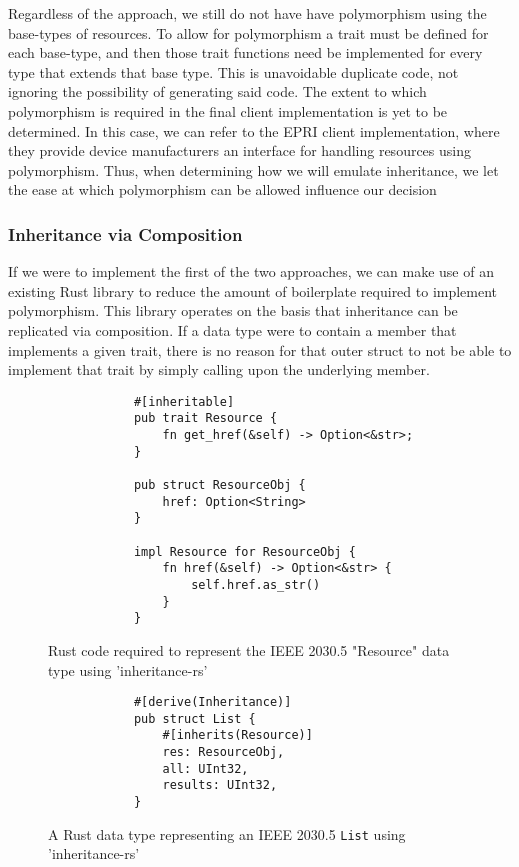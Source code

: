 Regardless of the approach, we still do not have have polymorphism using the base-types of resources.
To allow for polymorphism a trait must be defined for each base-type, and then those trait functions need be implemented for every type that extends that base type. 
This is unavoidable duplicate code, not ignoring the possibility of generating said code.
The extent to which polymorphism is required in the final client implementation is yet to be determined. In this case, we can refer to the EPRI client implementation, 
where they provide device manufacturers an interface for handling resources using polymorphism.
Thus, when determining how we will emulate inheritance, we let the ease at which polymorphism can be allowed influence our decision


\subsubsection{Inheritance via Composition}

If we were to implement the first of the two approaches, we can make use of an existing Rust library to reduce the amount of boilerplate required to implement polymorphism.
This library operates on the basis that inheritance can be replicated via composition. If a data type were to contain a member that implements a given trait, there is no reason for that outer struct to not be able to implement that trait by simply calling upon the underlying member.


\begin{figure}[H]
    \begin{center}
        \begin{lstlisting}
            #[inheritable]
            pub trait Resource {
                fn get_href(&self) -> Option<&str>;
            }

            pub struct ResourceObj {
                href: Option<String>
            }

            impl Resource for ResourceObj {
                fn href(&self) -> Option<&str> {
                    self.href.as_str()
                }
            }
        \end{lstlisting}
        \label{fig:resinher}
        \caption{Rust code required to represent the IEEE 2030.5 "Resource" data type using 'inheritance-rs'}
    \end{center}
\end{figure}

\begin{figure}[H]
    \begin{center}
        \begin{lstlisting}
            #[derive(Inheritance)]
            pub struct List {
                #[inherits(Resource)]
                res: ResourceObj,
                all: UInt32,
                results: UInt32,
            }
        \end{lstlisting}
        \label{fig:listinher}
        \caption{A Rust data type representing an IEEE 2030.5 \texttt{List} using 'inheritance-rs'}
    \end{center}
\end{figure}


